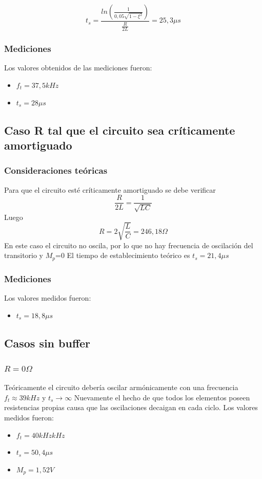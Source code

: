 \begin{equation}
    t_s=\frac{ln({\frac{1}{0,05\sqrt{1-\xi^2}}})}{\frac{R}{2L}}=25,3\mu s
\end{equation}
\subsubsection{Mediciones}
Los valores obtenidos de las mediciones fueron:
\begin{itemize}
  \item $f_t= 37,5 kHz$
  \item $t_s=28\mu s$
\end{itemize}

\subsection{Caso R tal que el circuito sea críticamente amortiguado}
\subsubsection{Consideraciones teóricas}
Para que el circuito esté críticamente amortiguado se debe verificar \begin{equation}
    \frac{R}{2L}=\frac{1}{\sqrt{LC}}
\end{equation}
Luego \begin{equation}
    R=2\sqrt{\frac{L}{C}}=246,18 \Omega
\end{equation}
En este caso el circuito no oscila, por lo que no hay frecuencia de oscilación del transitorio y $M_p$=0
El tiempo de establecimiento teórico es $t_s=21,4 \mu s$

\subsubsection{Mediciones}
Los valores medidos fueron:
\begin{itemize}
  \item $t_s= 18,8 \mu s$
\end{itemize}

\subsection{Casos sin buffer}
\subsubsection{$R=0\Omega$}
Teóricamente el circuito debería oscilar armónicamente con una frecuencia $f_t\approx39 kHz$ y $t_s\rightarrow\infty$
Nuevamente el hecho de que todos los elementos poseen resistencias propias causa que las oscilaciones decaigan en cada ciclo. Los valores medidos fueron:
\begin{itemize}
  \item $f_t= 40 kHz kHz$
  \item $t_s=50,4\mu s$
  \item $M_p=1,52 V$
\end{itemize}

